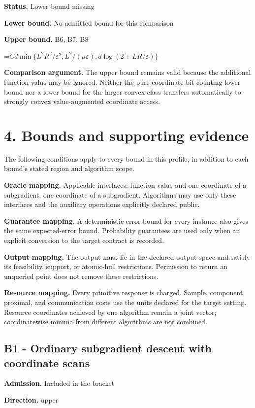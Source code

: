 \documentclass[10pt,a4paper]{article}
\newcommand{\AtlasMath}[1]{\par\begingroup\centering\setbox0=\hbox{$\displaystyle #1$}\ifdim\wd0>1.4\linewidth\typeout{ATLAS WIDE FORMULA: \the\wd0}\fi\ifdim\wd0>\linewidth\resizebox{\linewidth}{!}{\box0}\else\box0\fi\par\endgroup}
\begin{document}
\textbf{Status.} Lower bound missing

\textbf{Lower bound.} No admitted bound for this comparison

\textbf{Upper bound.} B6, B7, B8

\AtlasMath{Cd\min\{L^2R^2/\varepsilon^2,L^2/(\mu\varepsilon),d\log(2+LR/\varepsilon)\}}
\textbf{Comparison argument.} The upper bound remains valid because the additional function value may be ignored. Neither the pure-coordinate bit-counting lower bound nor a lower bound for the larger convex class transfers automatically to strongly convex value-augmented coordinate access.

\section{4. Bounds and supporting evidence}
The following conditions apply to every bound in this profile, in addition to each bound's stated region and algorithm scope.

\textbf{Oracle mapping.} Applicable interfaces: function value and one coordinate of a subgradient, one coordinate of a subgradient. Algorithms may use only these interfaces and the auxiliary operations explicitly declared public.

\textbf{Guarantee mapping.} A deterministic error bound for every instance also gives the same expected-error bound. Probability guarantees are used only when an explicit conversion to the target contract is recorded.

\textbf{Output mapping.} The output must lie in the declared output space and satisfy its feasibility, support, or atomic-hull restrictions. Permission to return an unqueried point does not remove these restrictions.

\textbf{Resource mapping.} Every primitive response is charged. Sample, component, proximal, and communication costs use the units declared for the target setting. Resource coordinates achieved by one algorithm remain a joint vector; coordinatewise minima from different algorithms are not combined.

\subsection{B1 - Ordinary subgradient descent with coordinate scans}
\textbf{Admission.} Included in the bracket

\textbf{Direction.} upper
\end{document}
